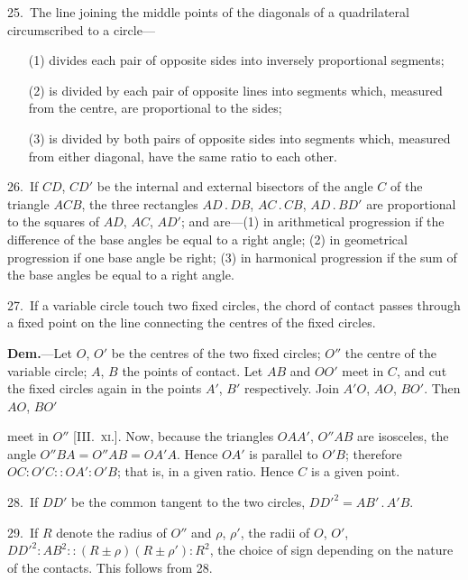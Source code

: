 \documentclass[oneside]{book}
\newcommand\imgcent[2]{
\begin{center}

\end{center}
}
\begin{document}
\begin{footnotesize}
25.~The line joining the middle points of the diagonals of a
quadrilateral circumscribed to a circle---
\begin{changemargin}{0.3in}{0in}
\begin{enumerate}
   \item[(1)] divides each pair of opposite sides into inversely proportional segments;
   \item[(2)] is divided by each pair of opposite lines into segments which, measured from the centre, are proportional to the sides;
   \item[(3)] is divided by both pairs of opposite sides into segments which, measured from either diagonal, have the same ratio to each other.
\end{enumerate}
\end{changemargin}

26.~If $CD$, $CD'$ be the internal and external bisectors of the
angle $C$ of the triangle $ACB$, the three rectangles $AD\,.\, DB$,
$AC\,.\, CB$, $AD\,.\, BD'$ are proportional to the squares of $AD$, $AC$,
$AD'$; and are---(1) in arithmetical progression if the difference of
the base angles be equal to a right angle; (2) in geometrical
progression if one base angle be right; (3) in harmonical
progression if the sum of the base angles be equal to a right angle.

27.~If a variable circle touch two fixed circles, the chord of
contact passes through a fixed point on the line connecting the
centres of the fixed circles.


\imgcent{304}{f213}

\textbf{Dem.}---Let $O$, $O'$ be the centres of the two fixed circles; $O''$
the centre of the variable circle; $A$, $B$ the points of contact. Let
$AB$ and $OO'$ meet in $C$, and cut the fixed circles again in the
points $A'$, $B'$ respectively. Join $A'O$, $AO$, $BO'$. Then $AO$, $BO'$

meet in $O''$ [III\@.~\textsc{xi.}]. Now, because the triangles $OAA'$, $O''AB$
are isosceles, the angle $O''BA = O''AB = OA'A$. Hence $OA'$ is
parallel to $O'B$; therefore $OC : O'C :: OA' : O'B$; that is, in a
given ratio. Hence $C$ is a given point.

28.~If $DD'$ be the common tangent to the two circles, $DD'^{2}
= AB' \,.\, A'B$.

29.~If $R$ denote the radius of $O''$ and $\rho$, $\rho'$, the radii of $O$, $O'$,
$DD'^{2} : AB^{2} :: (R \pm \rho)(R \pm \rho') : R^{2}$, the choice of sign depending
on the nature of the contacts. This follows from 28.


\end{footnotesize}
\end{document}
